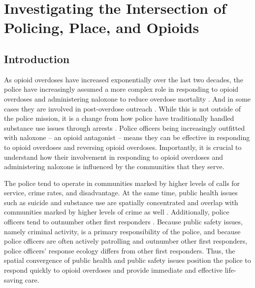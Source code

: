 \chapter{Investigating the Intersection of Policing, Place, and Opioids}



\section{\centering Introduction}
As opioid overdoses have increased exponentially over the last two decades, the police have increasingly assumed a more complex role in responding to opioid overdoses and administering naloxone to reduce overdose mortality \parencite{quinn_most_2019, ray_national_2023}. And in some cases they are involved in post-overdose outreach \parencite{formica_characteristics_2021,ray_national_2023}. While this is not outside of the police mission, it is a change from how police have traditionally handled substance use issues through arrests \parencite{cooper_war_2015}. Police officers being increasingly outfitted with naloxone -- an opioid antagonist -- means they can be effective in responding to opioid overdoses and reversing opioid overdoses. Importantly, it is crucial to understand how their involvement in responding to opioid overdoses and administering naloxone is influenced by the communities that they serve.

The police tend to operate in communities marked by higher levels of calls for service, crime rates, and disadvantage. At the same time, public health issues such as suicide and substance use are spatially concentrated and overlap with communities marked by higher levels of crime as well \parencite{feldmeyer_community_2022, hibdon_use_2024}. Additionally, police officers tend to outnumber other first responders \parencite{lurigio_opioid_2018}. Because public safety issues, namely criminal activity, is a primary responsibility of the police, and because police officers are often actively patrolling and outnumber other first responders, police officers' response ecology differs from other first responders. Thus, the spatial convergence of public health and public safety issues position the police to respond quickly to opioid overdoses and provide immediate and effective life-saving care.

